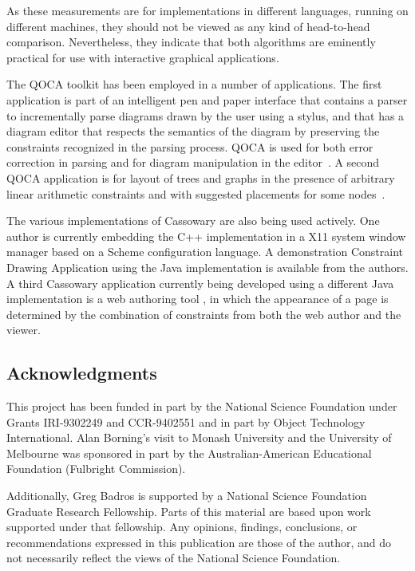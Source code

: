 \documentclass{article}
\begin{document}
As these measurements are for implementations in different languages,
running on different machines, they should not be viewed as any kind of
head-to-head comparison.  Nevertheless, they indicate that both
algorithms are eminently practical for use with interactive graphical
applications.

The QOCA toolkit has been employed in a number of applications.
The first application is part of an intelligent pen and paper
interface that contains a parser to incrementally parse diagrams drawn by
the user using a stylus, and that has a diagram editor that respects
the semantics of the diagram by preserving the constraints recognized
in the parsing process.  QOCA is used for both error correction in
parsing and for diagram manipulation in the editor~\cite{chok-marriott95}.
A second QOCA application is for layout of trees and graphs in the
presence of arbitrary linear arithmetic constraints and with
suggested placements for some nodes~\cite{he-marriott96}.

The various implementations of Cassowary are also being used actively.
One author is currently embedding the C++ implementation in a X11 system
window manager based on a Scheme configuration language. A demonstration
Constraint Drawing Application using the Java implementation is
available from the authors.  A third Cassowary application currently
being developed using a different Java implementation is a web authoring
tool \cite{borning-multimedia-97}, in which the appearance of a page is
determined by the combination of constraints from both the web author
and the viewer.

\subsection*{Acknowledgments}

This project has been funded in part by the National Science Foundation
under Grants \mbox{IRI-9302249} and \mbox{CCR-9402551} and in part by Object
Technology International.  Alan Borning's visit to Monash University and
the University of Melbourne was sponsored in part by the
Australian-American Educational Foundation (Fulbright Commission).

Additionally, Greg Badros is supported by a National Science Foundation
Graduate Research Fellowship.  Parts of this material are based upon
work supported under that fellowship.  Any opinions, findings,
conclusions, or recommendations expressed in this publication are those
of the author, and do not necessarily reflect the views of the National
Science Foundation.



\end{document}

